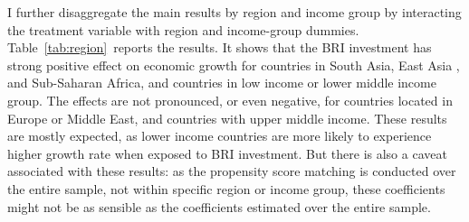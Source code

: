 \documentclass[10pt,a4paper]{article}
\begin{document}
I further disaggregate the main results by region and income group by
interacting the treatment variable with region and income-group dummies.
Table~{\ref{tab:region}}~reports the results. It shows
that the BRI investment has strong positive effect on economic growth
for countries in South Asia, East Asia , and Sub-Saharan Africa, and
countries in low income or lower middle income group. The effects are
not pronounced, or even negative, for countries located in Europe or
Middle East, and countries with upper middle income. These results are
mostly expected, as lower income countries are more likely to experience
higher growth rate when exposed to BRI investment. But there is also a
caveat associated with these results: as the propensity score matching
is conducted over the entire sample, not within specific region or
income group, these coefficients might not be as sensible as the
coefficients estimated over the entire sample.
\end{document}
